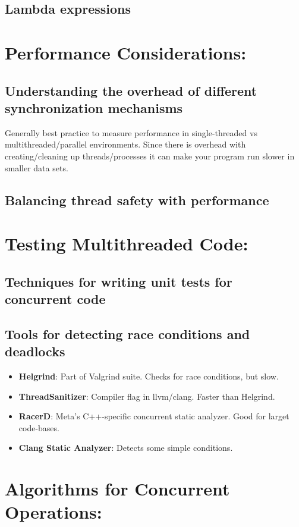 \documentclass{article}
\begin{document}
    \subsection{ Lambda expressions}
\section{Performance Considerations:}
    \subsection{ Understanding the overhead of different synchronization mechanisms \\}
      Generally best practice to measure performance in single-threaded vs multithreaded/parallel environments. Since there is overhead with creating/cleaning up threads/processes it can make your program run slower in smaller data sets.
    \subsection{ Balancing thread safety with performance}
\section{Testing Multithreaded Code:}
    \subsection{ Techniques for writing unit tests for concurrent code}
    \subsection{ Tools for detecting race conditions and deadlocks}
      \begin{itemize}
        \item \textbf{Helgrind}: Part of Valgrind suite. Checks for race conditions, but slow.
        \item \textbf{ThreadSanitizer}: Compiler flag in llvm/clang. Faster than Helgrind.
        \item \textbf{RacerD}: Meta's C++-specific concurrent static analyzer. Good for larget code-bases.
        \item \textbf{Clang Static Analyzer}: Detects some simple conditions.
      \end{itemize}
\section{Algorithms for Concurrent Operations:}
\end{document}
